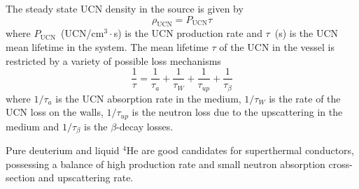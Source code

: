 
The steady state UCN density in the source is given by
\begin{equation}
\label{ucndensity}
\rho_{\text{UCN}}=P_{\text{UCN}} \tau
\end{equation}
where $P_{\text{UCN}}$~(UCN/cm$^3 \cdot$s) is the UCN production rate
and $\tau$~(s) is the UCN mean lifetime in the system.  The mean
lifetime $\tau$ of the UCN in the vessel is restricted by a variety of
possible loss mechanisms
\begin{equation}
\frac{1}{\tau} = \frac{1}{\tau_a}+ \frac{1}{\tau_W}+\frac{1}{\tau_{up}}+\frac{1}{\tau_{\beta}}
\end{equation}
where $1/\tau_a$ is the UCN absorption rate in the medium, $1/\tau_W$
is the rate of the UCN loss on the walls, $1/\tau_{up}$ is the neutron
loss due to the upscattering in the medium and $1/\tau_{\beta}$ is the
$\beta$-decay losses.

 Pure deuterium and liquid $^4$He are good candidates for superthermal
 conductors, possessing a balance of high production rate and small
 neutron absorption cross-section and upscattering rate.








